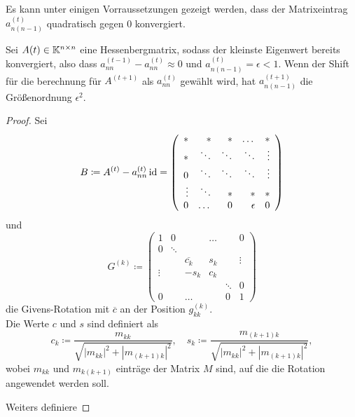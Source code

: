 \documentclass{article}
\begin{document}
Es kann unter einigen Vorraussetzungen gezeigt werden, dass der Matrixeintrag $a^{(t)}_{n(n-1)}$ quadratisch gegen 0 konvergiert.

\begin{theorem}
	Sei $A(t) \in \mathbb{K}^{n\times n}$ eine Hessenbergmatrix, sodass der kleinste Eigenwert bereits konvergiert, also dass $a^{(t-1)}_{nn} - a^{(t)}_{nn} \approx 0$ und $a^{(t)}_{n(n-1)} = \epsilon < 1$. Wenn der Shift für die berechnung für $A^{(t+1)}$ als $a^{(t)}_{nn}$ gewählt wird, hat $a^{(t+1)}_{n(n-1)}$ die Größenordnung $\epsilon^2$.
\end{theorem}
\begin{proof}
	Sei 
	\begin{equation*}
		B \coloneqq A^{(t)} - a^{(t)}_{nn} \operatorname{id} = \left( \begin{array}{rrrrr}
			* & * &* &\dots & * \\ 
			* & \ddots & \ddots &\ddots & \vdots \\
			0 & \ddots &\ddots & \ddots &\vdots \\
			\vdots & \ddots & * & * & * \\
			0 & \dots & 0 & \epsilon & 0\\
		\end{array}\right)
	\end{equation*}
und 
	\begin{equation*}
		G^{(k)} \coloneqq \left(\begin{array}{rrrrrr}
			1 & 0 & &\dots & & 0\\
			0 & \ddots & & & &\\
			 & & \overline{c_k} & s_k & &\vdots\\
			 \vdots & & -s_k & c_k & &\\
			 & & & & \ddots & 0\\
			 0 & & \dots & & 0 & 1
		\end{array}\right)
	\end{equation*}
	die Givens-Rotation mit $\overline{c}$ an der Position $g^{(k)}_{kk}$. \\
	Die Werte $c$ und $s$ sind definiert als
	\begin{equation}
		c_k \coloneqq \frac{m_{kk}}{\sqrt{|m_{kk}|^2 + |m_{(k+1)k}|^2}} , \quad s_k \coloneqq \frac{m_{(k+1)k}}{\sqrt{|m_{kk}|^2 + |m_{(k+1)k}|^2}},
	\end{equation}
 	wobei $m_{kk}$ und $m_{k(k+1)}$ einträge der Matrix $M$ sind, auf die die Rotation angewendet werden soll.
	
	Weiters definiere 
	

\end{proof}
\end{document}
